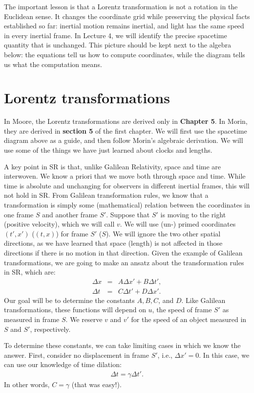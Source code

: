 \documentclass[12pt]{article}
\newcommand{\be}{\begin{eqnarray}}
\newcommand{\ee}{\end{eqnarray}}
\begin{document}
The important lesson is that a Lorentz transformation is not a rotation in the Euclidean sense. It changes the coordinate grid while preserving the physical facts established so far: inertial motion remains inertial, and light has the same speed in every inertial frame. In Lecture 4, we will identify the precise spacetime quantity that is unchanged. This picture should be kept next to the algebra below: the equations tell us how to compute coordinates, while the diagram tells us what the computation means.

\section{Lorentz transformations}\label{sec:LT}
In Moore, the Lorentz transformations are derived only in {\bf Chapter 5}. In Morin, they are derived in {\bf section 5} of the first chapter. We will first use the spacetime diagram above as a guide, and then follow Morin's algebraic derivation. We will use some of the things we have just learned about clocks and lengths.

A key point in SR is that, unlike Galilean Relativity, space and time are interwoven. We know a priori that we move both through space and time. While time is absolute and unchanging for observers in different inertial frames, this will not hold in SR. From Galilean transformation rules, we know that a transformation is simply some (mathematical) relation between the coordinates in one frame $S$ and another frame $S'$. Suppose that $S'$ is moving to the right (positive velocity), which we will call $v$. We will use (un-) primed coordinates $(t',x')$ ($(t,x)$) for frame $S'$ ($S$). We will ignore the two other spatial directions, as we have learned that space (length) is not affected in those directions if there is no motion in that direction. Given the example of Galilean transformations, we are going to make an ansatz about the transformation rules in SR, which are:
\be
\Delta x  &=& A \Delta x' + B \Delta t',\\
\Delta t  &=& C \Delta t' + D \Delta x'.
\ee
Our goal will be to determine the constants $A,B,C$, and $D$. Like Galilean transformations, these functions will depend on $u$, the speed of frame $S'$ as measured in frame $S$. We reserve $v$ and $v'$ for the speed of an object measured in $S$ and $S'$, respectively.

To determine these constants, we can take limiting cases in which we know the answer. First, consider no displacement in frame $S'$, i.e., $\Delta x' = 0$. In this case, we can use our knowledge of time dilation:
\be
\Delta t  = \gamma\Delta t'.
\ee
In other words, $C = \gamma$ (that was easy!).
\end{document}
